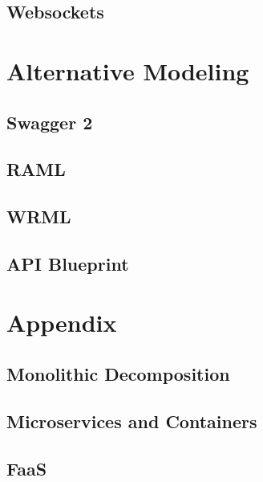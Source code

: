 \documentclass[12pt,oneside]{book} %
\begin{document}
\section{Websockets}

\chapter{Alternative Modeling}
\section{Swagger 2}
\section{RAML}
\section{WRML}
\section{API Blueprint}

\chapter{Appendix}
\section{Monolithic Decomposition}
\section{Microservices and Containers}
\section{FaaS}




\end{document}
